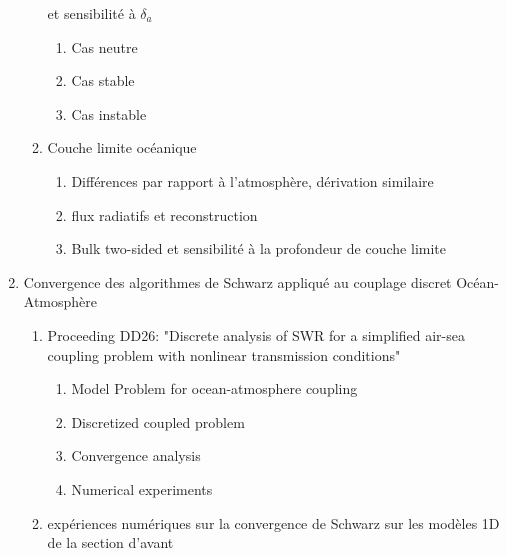 \documentclass{article}
\begin{document}
\begin{enumerate}
\begin{enumerate}
			et sensibilité à $\delta_a$
			\begin{enumerate}
				\item Cas neutre
				\item Cas stable
				\item Cas instable
			\end{enumerate}
		\item Couche limite océanique
			\begin{enumerate}
				\item Différences par rapport à
					l'atmosphère,
					dérivation similaire
				\item flux radiatifs et reconstruction
				\item Bulk two-sided et sensibilité à
					la profondeur de couche limite
			\end{enumerate}
	\end{enumerate}
\item Convergence des algorithmes de Schwarz appliqué au couplage
	discret Océan-Atmosphère
	\begin{enumerate}
	\item Proceeding DD26: "Discrete analysis of SWR for a
		simplified air-sea coupling problem
		with nonlinear transmission conditions"
		\begin{enumerate}
			\item Model Problem for ocean-atmosphere coupling
			\item Discretized coupled problem
			\item Convergence analysis
			\item Numerical experiments
		\end{enumerate}
	\item expériences numériques sur la convergence de Schwarz
		sur les modèles 1D de la section d'avant
	\end{enumerate}
\end{enumerate}
\end{document}

